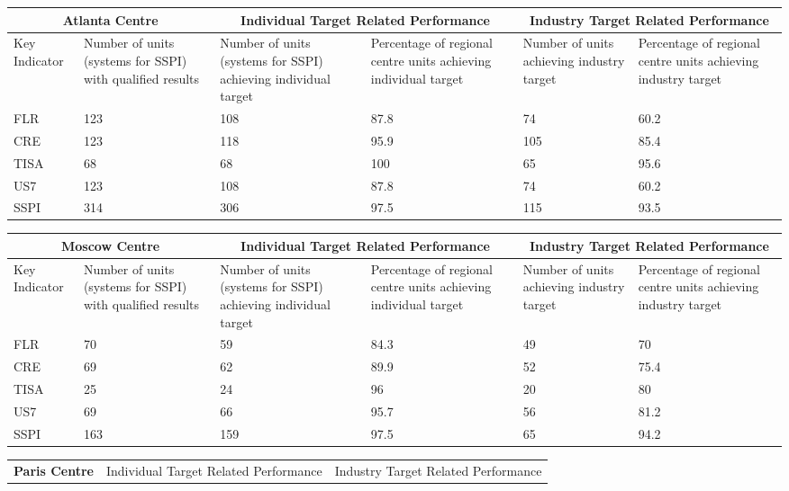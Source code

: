 \documentclass{article}
\begin{document}
\begin{center} \begin{tabular}{|p{1.5cm}||p{2.5cm}||p{2.5cm}|p{2.5cm}||p{2.5cm}|p{2.5cm}|} \hline\multicolumn{2}{|c||}{\textbf{ Atlanta Centre }} & \multicolumn{2}{|c||}{Individual Target Related Performance} & \multicolumn{2}{|c|}{Industry Target Related Performance} \\
\hline 
Key Indicator & Number of units (systems for SSPI) with qualified results & Number of units (systems for SSPI) achieving individual target & Percentage of regional centre units achieving individual target & Number of units achieving industry target & Percentage of regional centre units achieving industry target \\
\hline 
FLR & 123 & 108 & 87.8 & 74 & 60.2 \\
\hline 
CRE & 123 & 118 & 95.9 & 105 & 85.4 \\
\hline 
TISA & 68 & 68 & 100 & 65 & 95.6 \\
\hline 
US7 & 123 & 108 & 87.8 & 74 & 60.2 \\
\hline 
SSPI & 314 & 306 & 97.5 & 115 & 93.5 \\
\hline 
\end{tabular} \end{center}\begin{center} \begin{tabular}{|p{1.5cm}||p{2.5cm}||p{2.5cm}|p{2.5cm}||p{2.5cm}|p{2.5cm}|} \hline\multicolumn{2}{|c||}{\textbf{ Moscow Centre }} & \multicolumn{2}{|c||}{Individual Target Related Performance} & \multicolumn{2}{|c|}{Industry Target Related Performance} \\
\hline 
Key Indicator & Number of units (systems for SSPI) with qualified results & Number of units (systems for SSPI) achieving individual target & Percentage of regional centre units achieving individual target & Number of units achieving industry target & Percentage of regional centre units achieving industry target \\
\hline 
FLR & 70 & 59 & 84.3 & 49 & 70 \\
\hline 
CRE & 69 & 62 & 89.9 & 52 & 75.4 \\
\hline 
TISA & 25 & 24 & 96 & 20 & 80 \\
\hline 
US7 & 69 & 66 & 95.7 & 56 & 81.2 \\
\hline 
SSPI & 163 & 159 & 97.5 & 65 & 94.2 \\
\hline 
\end{tabular} \end{center}\begin{center} \begin{tabular}{|p{1.5cm}||p{2.5cm}||p{2.5cm}|p{2.5cm}||p{2.5cm}|p{2.5cm}|} \hline\multicolumn{2}{|c||}{\textbf{ Paris Centre }} & \multicolumn{2}{|c||}{Individual Target Related Performance} & \multicolumn{2}{|c|}{Industry Target Related Performance} \\

\end{tabular}
\end{center}
\end{document}

